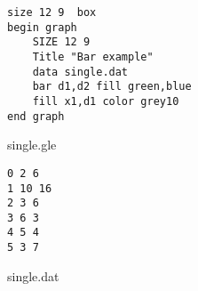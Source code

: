
\vfill
\begin{center}
\begin{minipage}[t]{9.0cm}
\begin{verbatim}
size 12 9  box
begin graph
	SIZE 12 9
	Title "Bar example"
	data single.dat
	bar d1,d2 fill green,blue 
	fill x1,d1 color grey10
end graph
\end{verbatim}
\hfill {\small single.gle}\\
\vfill
\begin{verbatim}
0 2 6
1 10 16
2 3 6 
3 6 3
4 5 4 
5 3 7 
\end{verbatim}
\hfill {\small single.dat}\\
\end{minipage}
\end{center}
